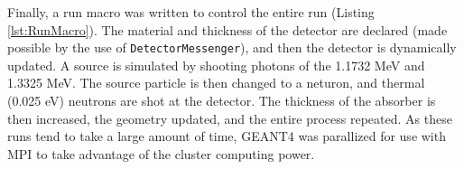 Finally, a run macro was written to control the entire run (Listing \ref{lst:RunMacro}).
The material and thickness of the detector are declared (made possible by the use of \verb+DetectorMessenger+), and then the detector is dynamically updated.
A  source is simulated by shooting photons of the 1.1732 MeV and 1.3325 MeV.
The source particle is then changed to a neturon, and thermal (0.025 eV) neutrons are shot at the detector. 
The thickness of the absorber is then increased, the geometry updated, and the entire process repeated.
As these runs tend to take a large amount of time, GEANT4 was parallized for use with MPI to take advantage of the cluster computing power.

